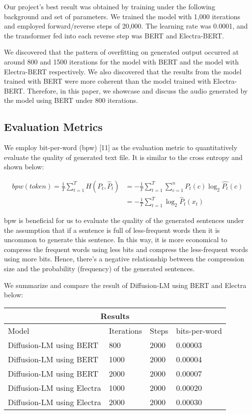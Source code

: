 \documentclass{article}
\begin{document}
Our project's best result was obtained by training under the following background and set of parameters. We trained the model with 1,000 iterations and employed forward/reverse steps of 20,000. The learning rate was 0.0001, and the transformer fed into each reverse step was BERT and Electra-BERT. 

We discovered that the pattern of overfitting on generated output occurred at around 800 and 1500 iterations for the model with BERT and the model with Electra-BERT respectively. We also discovered that the results from the model trained with BERT were more coherent than the model trained with Electra-BERT. Therefore, in this paper, we showcase and discuss the audio generated by the model using BERT under 800 iterations. 


\subsection{Evaluation Metrics}


We employ bit-per-word (bpw) [11] as the evaluation metric to quantitatively evaluate the quality of generated text file. It is similar to the cross entropy and shown below:

\begin{equation}
    \begin{split}
        bpw(token) = \frac{1}{T}\sum\limits_{t=1}^{T}H(P_t, \hat{P}_t) 
        & = - \frac{1}{T} \sum\limits_{t=1}^{T}
        \sum\limits_{c=1}^{n} P_t(c)\log_2\hat{P_t}(c)\\
        & = - \frac{1}{T} \sum\limits_{t=1}^{T}\log_2\hat{P}_t(x_t)
    \end{split}
\end{equation}

bpw is beneficial for us to evaluate the quality of the generated sentences under the assumption that if a sentence is full of less-frequent words then it is uncommon to generate this sentence. In this way, it is more economical to compress the frequent words using less bits and compress the less-frequent words using more bits. Hence, there's a negative relationship between the compression size and the probability (frequency) of the generated sentences.

We summarize and compare the result of Diffusion-LM using BERT and Electra below:\\

\begin{tabular}{ |p{5cm}||p{2cm}||p{3cm}||p{3cm}|}
 \hline
 \multicolumn{4}{|c|}{Results} \\
 \hline
 Model & Iterations & Steps & bits-per-word\\
 \hline
  Diffusion-LM using BERT  & 800  & 2000 &  0.00003   \\
 Diffusion-LM using BERT  & 1000  & 2000 &  0.00004   \\
 Diffusion-LM using BERT  & 2000 &  2000 & 0.00007  \\
 Diffusion-LM using Electra & 1000 &  2000 & 0.00020  \\
 Diffusion-LM using Electra & 2000 &  2000 & 0.00030  \\
 \hline
\end{tabular}\\
\end{document}
